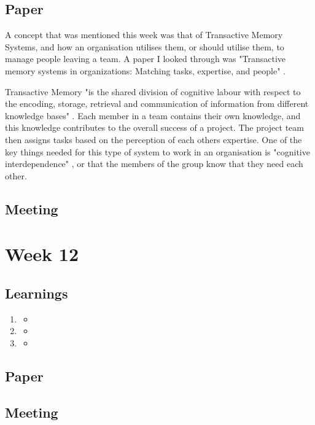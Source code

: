 \section{Paper}

A concept that was mentioned this week was that of Transactive Memory Systems, and how an organisation utilises them, or should utilise them, to manage people leaving a team. A paper I looked through was "Transactive memory systems in organizations: Matching tasks, expertise, and people" \parencite{week11}. 

Transactive Memory "is the shared division of cognitive labour with respect to the encoding, storage, retrieval and communication of information from different knowledge bases" \parencite{week11}. Each member in a team contains their own knowledge, and this knowledge contributes to the overall success of a project. The project team then assigns tasks based on the perception of each others expertise. One of the key things needed for this type of system to work in an organisation is "cognitive interdependence" \parencite{week11}, or that the members of the group know that they need each other.

\section{Meeting}
\chapter{Week 12}

\section{Learnings}
\begin{enumerate}
\item
\begin{itemize}
\item
\end{itemize}
\item
\begin{itemize}
\item
\end{itemize}
\item
\begin{itemize}
\item
\end{itemize}
\end{enumerate}

\section{Paper}

\section{Meeting}


